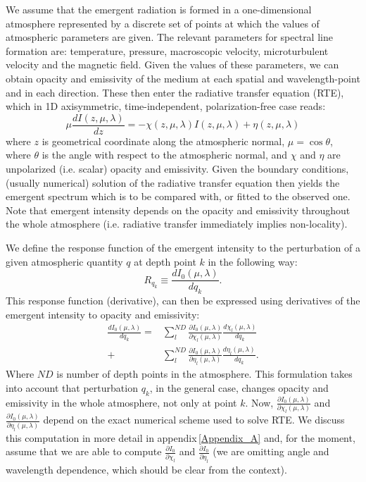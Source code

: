 \documentclass[referee]{aa}
\begin{document}
We assume that the emergent radiation is formed in a one-dimensional atmosphere represented by a discrete set of points at which the values of atmospheric parameters are given. The relevant parameters for spectral line formation are: temperature, pressure, macroscopic velocity, microturbulent velocity and the magnetic field. Given the values of these parameters, we can obtain opacity and emissivity of the medium at each spatial and wavelength-point and in each direction. These then enter the radiative transfer equation (RTE), which in 1D axisymmetric, time-independent, polarization-free case reads:
\begin{equation}
 \mu \frac{dI(z,\mu,\lambda)}{dz} = -\chi(z,\mu,\lambda) I(z,\mu,\lambda) + \eta(z,\mu,\lambda)
 \label{rte}
\end{equation}
where $z$ is geometrical coordinate along the atmospheric normal, $\mu = \cos \theta$, where $\theta$ is the angle with respect to the atmospheric normal, and $\chi$ and $\eta$ are unpolarized (i.e. scalar) opacity and emissivity. Given the boundary conditions, (usually numerical) solution of the radiative transfer equation then yields the emergent spectrum which is to be compared with, or fitted to the observed one. Note that emergent intensity depends on the opacity and emissivity throughout the whole atmosphere (i.e. radiative transfer immediately implies non-locality). 

We define the response function of the emergent intensity to the perturbation of a given atmospheric quantity $q$ at depth point $k$ in the following way:
\begin{equation}
 R_{q_k} \equiv \frac{d I_0(\mu,\lambda)}{d q_k}.
\end{equation}
This response function (derivative), can then be expressed using derivatives of the emergent intensity to opacity and emissivity:
\begin{align}
 \frac{d I_0(\mu,\lambda)}{d q_k} = & \sum_l^{ND} \frac{\partial I_0(\mu,\lambda)}{\partial \chi_l(\mu,\lambda)} \frac{d \chi_l(\mu,\lambda)}{d q_k} \nonumber \\
 + & \sum_l^{ND} \frac{\partial I_0(\mu,\lambda)}{\partial \eta_l(\mu,\lambda)} \frac{d \eta_l(\mu,\lambda)}{d q_k}.
\end{align}
Where $ND$ is number of depth points in the atmosphere. This formulation takes into account that perturbation $q_k$, in the general case, changes opacity and emissivity in the whole atmosphere, not only at point $k$. Now, $\frac{\partial I_0(\mu,\lambda)}{\partial \chi_l(\mu,\lambda)}$ and $\frac{\partial I_0(\mu,\lambda)}{\partial \eta_l(\mu,\lambda)}$ depend on the exact numerical scheme used to solve RTE. We discuss this computation in more detail in appendix\,\ref{Appendix_A} and, for the moment, assume that we are able to compute $\frac{\partial I_0}{\partial \chi_l}$ and $\frac{\partial I_0}{\partial \eta_l}$ (we are omitting angle and wavelength dependence, which should be clear from the context).
\end{document}
